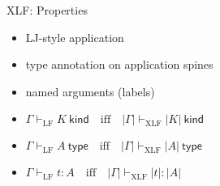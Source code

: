 \documentclass[ignorenonframetext,red]{beamer}
\newcommand\jlangt[4]{{#2}\vdash_{\mathrm{#1}}{#3}:{#4}}
\newcommand\jlangA[3]{{#2}\vdash_{\mathrm{#1}}{#3}\mathsf{\ type}}
\newcommand\jlangK[3]{{#2}\vdash_{\mathrm{#1}}{#3}\mathsf{\ kind}}
\newcommand\jlft[3]{\jlangt{LF}{#1}{#2}{#3}}
\newcommand\jlfA[2]{\jlangA{LF}{#1}{#2}}
\newcommand\jlfK[2]{\jlangK{LF}{#1}{#2}}
\newcommand\jxlft[3]{\jlangt{XLF}{#1}{#2}{#3}}
\newcommand\jxlfA[2]{\jlangA{XLF}{#1}{#2}}
\newcommand\jxlfK[2]{\jlangK{XLF}{#1}{#2}}
\begin{document}
\begin{frame}{XLF: Properties}
  \begin{itemize}
  \item LJ-style application
  \item type annotation on application spines
  \item named arguments (labels)
  \end{itemize}
  \begin{lemma}[Conservativity]
    \begin{itemize}
    \item $\jlfK \Gamma K \quad\text{iff}\quad \jxlfK {|\Gamma|} {|K|}$
    \item $\jlfA \Gamma A \quad\text{iff}\quad \jxlfA {|\Gamma|} {|A|}$
    \item $\jlft \Gamma t A \quad\text{iff}\quad \jxlft {|\Gamma|} {|t|} {|A|}$
    \end{itemize}
  \end{lemma}
\end{frame}
\end{document}
